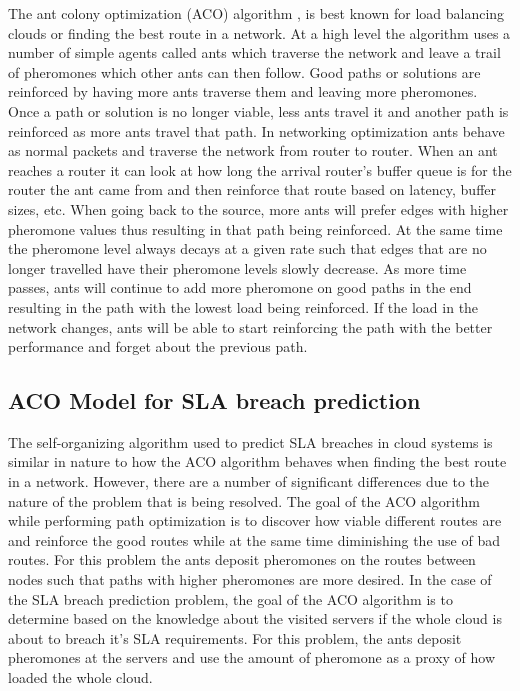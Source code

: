 \documentclass[conference]{IEEEtran}
\begin{document}
The ant colony optimization (ACO) algorithm \cite{antalgorithm}, \cite{selforg:aco} is best known for load balancing clouds or finding the best route in a network. At a high level the algorithm uses a number of simple agents called ants which traverse the network and leave a trail of pheromones which other ants can then follow. Good paths or solutions are reinforced by having more ants traverse them and leaving more pheromones. Once a path or solution is no longer viable, less ants travel it and another path is reinforced as more ants travel that path. In networking optimization ants behave as normal packets and traverse the network from router to router. When an ant reaches a router it can look at how long the arrival router's buffer queue is for the router the ant came from and then reinforce that route based on latency, buffer sizes, etc. When going back to the source, more ants will prefer edges with higher pheromone values thus resulting in that path being reinforced. At the same time the pheromone level always decays at a given rate such that edges that are no longer travelled have their pheromone levels slowly decrease. As more time passes, ants will continue to add more pheromone on good paths in the end resulting in the path with the lowest load being reinforced. If the load in the network changes, ants will be able to start reinforcing the path with the better performance and forget about the previous path.

\subsection{ACO Model for SLA breach prediction}

The self-organizing algorithm used to predict SLA breaches in cloud systems is similar in nature to how the ACO algorithm behaves when finding the best route in a network. However, there are a number of significant differences due to the nature of the problem that is being resolved. The goal of the ACO algorithm while performing path optimization is to discover how viable different routes are and reinforce the good routes while at the same time diminishing the use of bad routes. For this problem the ants deposit pheromones on the routes between nodes such that paths with higher pheromones are more desired. In the case of the SLA breach prediction problem, the goal of the ACO algorithm is to determine based on the knowledge about the visited servers if the whole cloud is about to breach it's SLA requirements. For this problem, the ants deposit pheromones at the servers and use the amount of pheromone as a proxy of how loaded the whole cloud.
\end{document}

